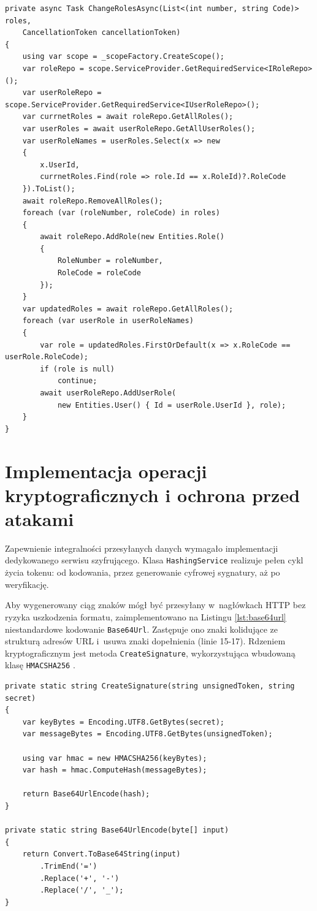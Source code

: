 \documentclass{SGGW-thesis}
\begin{document}
\begin{lstlisting}[caption={Bezpieczna migracja masek bitowych w przypadku zmian w kodzie}, label={lst:migration}]   
private async Task ChangeRolesAsync(List<(int number, string Code)> roles, 
    CancellationToken cancellationToken)
{
    using var scope = _scopeFactory.CreateScope();
    var roleRepo = scope.ServiceProvider.GetRequiredService<IRoleRepo>();
    var userRoleRepo = scope.ServiceProvider.GetRequiredService<IUserRoleRepo>();
    var currnetRoles = await roleRepo.GetAllRoles();
    var userRoles = await userRoleRepo.GetAllUserRoles();
    var userRoleNames = userRoles.Select(x => new
    {
        x.UserId,
        currnetRoles.Find(role => role.Id == x.RoleId)?.RoleCode
    }).ToList();
    await roleRepo.RemoveAllRoles();
    foreach (var (roleNumber, roleCode) in roles)
    {
        await roleRepo.AddRole(new Entities.Role() 
        { 
            RoleNumber = roleNumber, 
            RoleCode = roleCode 
        });
    }
    var updatedRoles = await roleRepo.GetAllRoles();
    foreach (var userRole in userRoleNames)
    {
        var role = updatedRoles.FirstOrDefault(x => x.RoleCode == userRole.RoleCode);
        if (role is null)
            continue;
        await userRoleRepo.AddUserRole(
            new Entities.User() { Id = userRole.UserId }, role);
    }
}
\end{lstlisting}

\section{Implementacja operacji kryptograficznych i ochrona przed atakami}

Zapewnienie integralności przesyłanych danych wymagało implementacji dedykowanego serwisu szyfrującego. Klasa \texttt{HashingService} realizuje pełen cykl życia tokenu: od kodowania, przez generowanie cyfrowej sygnatury, aż po weryfikację. 

Aby wygenerowany ciąg znaków mógł być przesyłany w~nagłówkach HTTP bez ryzyka uszkodzenia formatu, zaimplementowano na Listingu \ref{lst:base64url} niestandardowe kodowanie \texttt{Base64Url}. Zastępuje ono znaki kolidujące ze strukturą adresów URL i~usuwa znaki dopełnienia (linie 15-17). Rdzeniem kryptograficznym jest metoda \texttt{CreateSignature}, wykorzystująca wbudowaną klasę \texttt{HMACSHA256} \cite{stallings2017}.

\begin{lstlisting}[caption={Prywatne metody kodowania algorytmu Base64Url i sum HMAC}, label={lst:base64url}]    
private static string CreateSignature(string unsignedToken, string secret)
{
    var keyBytes = Encoding.UTF8.GetBytes(secret);
    var messageBytes = Encoding.UTF8.GetBytes(unsignedToken);

    using var hmac = new HMACSHA256(keyBytes);
    var hash = hmac.ComputeHash(messageBytes);
    
    return Base64UrlEncode(hash);
}

private static string Base64UrlEncode(byte[] input)
{
    return Convert.ToBase64String(input)
        .TrimEnd('=')
        .Replace('+', '-')
        .Replace('/', '_');
}
\end{lstlisting}
\end{document}
